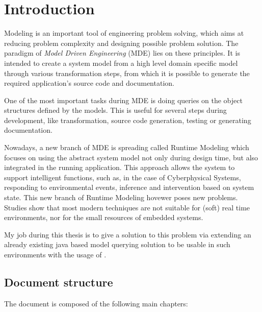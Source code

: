 \chapter*{Introduction}

Modeling is an important tool of engineering problem solving, which aims at
reducing problem complexity and designing possible problem solution. The
paradigm of \emph{Model Driven Engineering} (MDE) lies on these principles. It
is intended to create a system model from a high level domain specific model
through various transformation steps, from which it is possible to generate the
required application's source code and documentation.

One of the most important tasks during MDE is doing queries on the object
structures defined by the models. This is useful for several steps during
development, like transformation, source code generation, testing or generating
documentation.

Nowadays, a new branch of MDE is spreading called Runtime Modeling which focuses
on using the abstract system model not only during design time, but also
integrated in the running application. This approach allows the system to
support intelligent functions, such as, in the case of Cyberphysical Systems,
responding to environmental events, inference and intervention based on system
state. This new branch of Runtime Modeling hovewer poses new problems. Studies show
that most modern techniques are not suitable for (soft) real time environments,
nor for the small resources of embedded systems.

My job during this thesis is to give a solution to this problem via
extending an already existing java based model querying solution to be usable in
such environments with the usage of \CPP{}.

\section*{Document structure}\label{sec:DocumentStructure}

The document is composed of the following main chapters:

